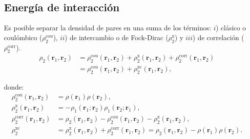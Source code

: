 %
%
%

\subsection{Energía de interacción}

Es posible separar la densidad de pares en una suma de los términos: $i$)
clásico o coulómbico ($\rho_2^\mathrm{cou}$), $ii$) de intercambio o de
Fock-Dirac ($\rho_2^\mathrm{x}$) y $iii$) de correlación
($\rho_2^\mathrm{corr}$).
%
\begin{align} \label{divRho2}
  \rho_2(\mathbf{r}_1, \mathbf{r}_2) &=
  \rho_2^{\mathrm{cou}}(\mathbf{r}_1, \mathbf{r}_2)
  + \rho_2^{\mathrm{x}}(\mathbf{r}_1, \mathbf{r}_2)
  + \rho_2^{\mathrm{corr}}(\mathbf{r}_1, \mathbf{r}_2)\nonumber\\
  &= \rho_2^{\mathrm{cou}}(\mathbf{r}_1, \mathbf{r}_2)
  + \rho_2^{\mathrm{xc}}(\mathbf{r}_1, \mathbf{r}_2),
\end{align} 

\noindent donde:
%
\begin{align}
  \rho_2^{\mathrm{cou}}(\mathbf{r}_1, \mathbf{r}_2) &= \rho(\mathbf{r}_1)
  \rho(\mathbf{r}_2), \label{rho2C} \\
  \rho_2^{\mathrm{x}}(\mathbf{r}_1, \mathbf{r}_2)  &=  - \rho_1(\mathbf{r}_1;\mathbf{r}_2)
  \rho_1(\mathbf{r}_2;\mathbf{r}_1), \label{rho2X} \\
  \rho_2^{\mathrm{corr}}(\mathbf{r}_1, \mathbf{r}_2) &=
  \rho_2(\mathbf{r}_1, \mathbf{r}_2)
    - \rho_2^{\mathrm{cou}}(\mathbf{r}_1, \mathbf{r}_2)
    - \rho_2^{\mathrm{x}}(\mathbf{r}_1, \mathbf{r}_2), \label{rho2Corr} \\
  \rho_2^{\mathrm{xc}} &=  
  \rho_2^{\mathrm{x}}(\mathbf{r}_1, \mathbf{r}_2)
    + \rho_2^{\mathrm{corr}}(\mathbf{r}_1, \mathbf{r}_2) = \rho_2(\mathbf{r}_1, \mathbf{r}_2) -
  \rho(\mathbf{r}_1) \rho(\mathbf{r}_2).
  \label{rho2xc}
\end{align}

